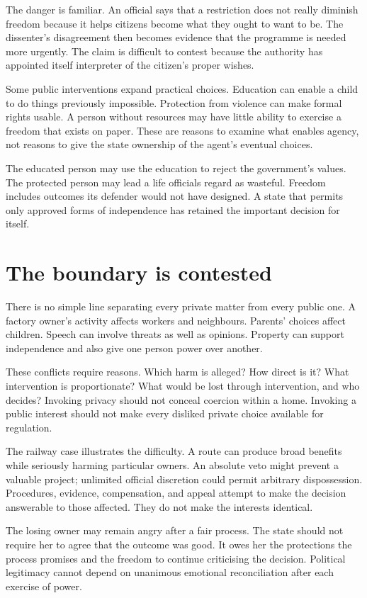 \documentclass[12pt,a4paper]{book}
\begin{document}
The danger is familiar. An official says that a restriction does not really diminish freedom because it helps citizens become what they ought to want to be. The dissenter's disagreement then becomes evidence that the programme is needed more urgently. The claim is difficult to contest because the authority has appointed itself interpreter of the citizen's proper wishes.

Some public interventions expand practical choices. Education can enable a child to do things previously impossible. Protection from violence can make formal rights usable. A person without resources may have little ability to exercise a freedom that exists on paper. These are reasons to examine what enables agency, not reasons to give the state ownership of the agent's eventual choices.

The educated person may use the education to reject the government's values. The protected person may lead a life officials regard as wasteful. Freedom includes outcomes its defender would not have designed. A state that permits only approved forms of independence has retained the important decision for itself.

\section*{The boundary is contested}

There is no simple line separating every private matter from every public one. A factory owner's activity affects workers and neighbours. Parents' choices affect children. Speech can involve threats as well as opinions. Property can support independence and also give one person power over another.

These conflicts require reasons. Which harm is alleged? How direct is it? What intervention is proportionate? What would be lost through intervention, and who decides? Invoking privacy should not conceal coercion within a home. Invoking a public interest should not make every disliked private choice available for regulation.

The railway case illustrates the difficulty. A route can produce broad benefits while seriously harming particular owners. An absolute veto might prevent a valuable project; unlimited official discretion could permit arbitrary dispossession. Procedures, evidence, compensation, and appeal attempt to make the decision answerable to those affected. They do not make the interests identical.

The losing owner may remain angry after a fair process. The state should not require her to agree that the outcome was good. It owes her the protections the process promises and the freedom to continue criticising the decision. Political legitimacy cannot depend on unanimous emotional reconciliation after each exercise of power.
\end{document}
